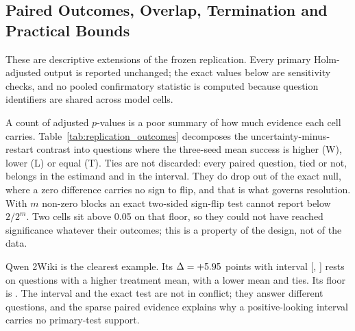 \documentclass{article}
\begin{document}
\begin{table}[htbp]
\centering\footnotesize
\caption{Full-cohort accepted percentage, preserving initially accepted
answers and applying repair outcomes only to failures. $\Delta$ is
uncertainty minus restart in percentage points.}
\label{tab:outcome_full_cohort}

\end{table}

\subsection{Paired Outcomes, Overlap, Termination and Practical Bounds}
\label{app:replication_diagnostics}
These are descriptive extensions of the frozen replication. Every primary
Holm-adjusted output is reported unchanged; the exact values below are
sensitivity checks, and no pooled confirmatory statistic is computed because
question identifiers are shared across model cells.

A count of adjusted $p$-values is a poor summary of how much evidence each
cell carries. Table~\ref{tab:replication_outcomes} decomposes the
uncertainty-minus-restart contrast into questions where the three-seed mean
success is higher (W), lower (L) or equal (T). Ties are not discarded: every
paired question, tied or not, belongs in the estimand and in the interval.
They do drop out of the exact null, where a zero difference carries no sign to
flip, and that is what governs resolution. With $m$ non-zero blocks an exact
two-sided sign-flip test cannot report below $2/2^{m}$. Two cells sit above
0.05 on that floor, so they could not have reached significance whatever their
outcomes; this is a property of the design, not of the data.

\begin{table}[htbp]
\centering\footnotesize
\caption{Paired uncertainty-minus-restart outcomes per cell. $N_q$ is the
paired question count; W, L and T are questions with higher, lower and equal
three-seed mean success. Floor is the smallest two-sided sign-flip $p$
attainable given the non-zero block count. $\Delta$ and its percentile
interval are the frozen primary outputs, in percentage points.}
\label{tab:replication_outcomes}

\end{table}

Qwen 2Wiki is the clearest example. Its $\Delta=+5.95{}$ points
with interval [\RepExampleLow{}, \RepExampleHigh{}] rests on
\RepExampleWins{} questions with a higher treatment mean,
\RepExampleLosses{} with a lower mean and \RepExampleTies{} ties. Its floor is
\RepExampleFloor{}. The interval and the exact test are not in conflict; they
answer different questions, and the sparse paired evidence explains why a
positive-looking interval carries no primary-test support.
\end{document}
